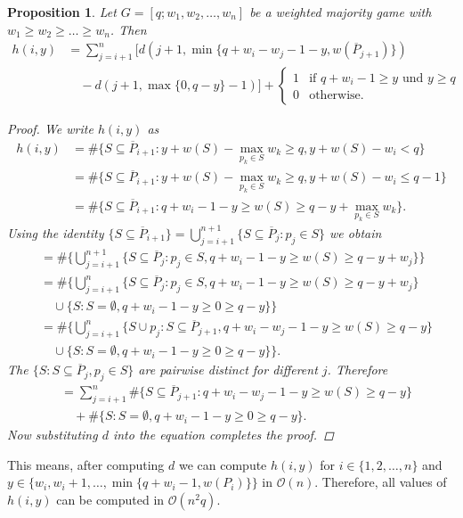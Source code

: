 \documentclass[review]{elsarticle}
\newtheorem{prop}[thm]{Proposition}
\theoremstyle{defn}
\theoremstyle{Pseudo-Code}
\begin{document}
\begin{prop}
\label{prop:h}
Let $G=[q;w_1,w_2,\dots,w_n]$ be a weighted majority game with $w_1\geq w_2\geq \dots \geq w_n$. Then
\begin{align*}
  h(i,y)
  &=
  \sum\limits_{j=i+1}^{n}
  \Big[
    d(j+1,\min\{q+w_i-w_j-1-y,w(\overline{P}_{j+1})\})
\\
  &\quad
    -d(j+1,\max\{0,q-y\}-1)
  \Big]
  + 
 \begin{cases}
   1 &  \text{if } q+w_i-1\geq y \text{ und } y\geq q \\
   0 & \text{otherwise.}
 \end{cases} 
\end{align*}
\begin{proof}
We write $h(i,y)$ as
\begin{align*}
  h(i,y)
  &=
   \#\{
       S\subseteq \overline{P}_{i+1}: 
       y+w(S)-\max\limits_{p_k\in S}w_k \geq q, 
	   y+w(S)-w_i<q
     \}
\\
  &=
   \#\{
       S\subseteq \overline{P}_{i+1}: 
       y+w(S)-\max\limits_{p_k\in S}w_k \geq q, 
	   y+w(S)-w_i\leq q-1
     \}  
\\
  &=
   \#\{
      S\subseteq \overline{P}_{i+1}: 
       q+w_i-1-y\geq w(S) \geq q-y+\max\limits_{p_k\in S}w_k
     \} 
     .
\end{align*}
Using the identity $\{S\subseteq\overline{P}_{i+1}\}=\bigcup_{j=i+1}^{n+1}\{S\subseteq \overline{P}_{j}: p_j\in S \}$ we obtain
\begin{align*}
  &=
   \#\{\bigcup_{j=i+1}^{n+1}\{
       S\subseteq \overline{P}_{j}: 
       p_j\in S,
       q+w_i-1-y\geq w(S) \geq q-y+w_j
       \}
     \} 
\\
  &=
   \#\{\bigcup_{j=i+1}^{n}\{
       S\subseteq \overline{P}_{j}: 
       p_j\in S,
       q+w_i-1-y\geq w(S) \geq q-y+w_j
       \}  
\\      
 &\quad
 \cup 
  \{S: 
       S=\emptyset,
       q+w_i-1-y\geq 0 \geq q-y
       \}
     \}      
\\
  &=
   \# \{\bigcup_{j=i+1}^{n}\{ 
       S\cup p_j:
       S\subseteq \overline{P}_{j+1}, 
       q+w_i-w_j-1-y\geq w(S) \geq q-y
       \}
\\      
 &\quad    
 \cup 
  \{S: 
       S=\emptyset,
       q+w_i-1-y\geq 0 \geq q-y
       \}
     \}  
     .
\end{align*}
The $\{S:S\subseteq \overline{P}_{j},p_{j}\in S\}$ are pairwise distinct for different $j$. Therefore
\begin{align*}
  &=
  \sum\limits_{j=i+1}^{n}
    \#\{
       S\subseteq \overline{P}_{j+1}: 
         q+w_i-w_j-1-y\geq w(S) \geq q-y
     \}    
\\      
 &\quad   + 
  \#\{S: 
       S=\emptyset,
       q+w_i-1-y\geq 0 \geq q-y
       \}       
       .                                  
\end{align*}
Now substituting $d$ into the equation completes the proof.
\end{proof}  
\end{prop}
This means, after computing $d$ we can compute $h(i,y)$ for $i \in\{1,2,\dots,n\}$ and $y\in \{w_i,w_i+1,\dots,\min\{q + w_i - 1, w(P_i)\}\}$ in $\mathcal{O}(n)$. Therefore, all values of $h(i,y)$ can be computed in $\mathcal{O}(n^2q)$.
\end{document}
